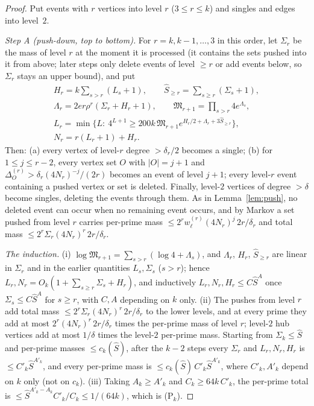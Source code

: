 \documentclass[11pt,reqno]{amsart}
\theoremstyle{definition}
\begin{document}
\begin{proof}
Put events with $r$ vertices into level $r$ ($3\le r\le k$) and singles and
edges into level~$2$.

\emph{Step A (push-down, top to bottom).}  For $r=k,k-1,\dots,3$ in this order,
let $\Sigma_r$ be the mass of level $r$ at the moment it is processed (it
contains the sets pushed into it from above; later steps only delete events
of level $\ge r$ or add events below, so $\Sigma_r$ stays an upper bound), and
put
\begin{gather*}
 H_r=k\sum_{s>r}(L_s+1),\qquad \hat S_{\ge r}=\sum_{s\ge r}(\Sigma_s+1),\\
 \Lambda_r=2er\rho^r(\Sigma_r+H_r+1),\qquad \mathfrak M_{r+1}=\prod_{s>r}4e^{\Lambda_s},\\
 L_r=\min\{L:\ 4^{L+1}\ge200k\,\mathfrak M_{r+1}e^{H_r/2+\Lambda_r+3\hat S_{\ge r}}\},\\
 N_r=r(L_r+1)+H_r .
\end{gather*}
Then: \textup{(a)} every vertex of level-$r$ degree $>\delta_r/2$ becomes a
single; \textup{(b)} for $1\le j\le r-2$, every vertex set $O$ with $|O|=j+1$
and $\Delta^{(r)}_O>\delta_r(4N_r)^{-j}/(2r)$ becomes an event of level $j+1$;
every level-$r$ event containing a pushed vertex or set is deleted.  Finally,
level-$2$ vertices of degree $>\delta$ become singles, deleting the events
through them.  As in Lemma~\ref{lem:push}, no deleted event can occur when no
remaining event occurs, and by Markov a set pushed from level $r$ carries
per-prime mass $\le2^rw^{(r)}_\ell(4N_r)^j\,2r/\delta_r$ and total mass
$\le2^r\Sigma_r(4N_r)^r\,2r/\delta_r$.

\emph{The induction.}  (i) $\log\mathfrak M_{r+1}=\sum_{s>r}(\log4+\Lambda_s)$, and
$\Lambda_r$, $H_r$, $\hat S_{\ge r}$ are linear in $\Sigma_r$ and in the earlier
quantities $L_s,\Sigma_s$ ($s>r$); hence
$L_r,N_r=O_k(1+\sum_{s\ge r}\Sigma_s+H_r)$, and inductively
$L_r,N_r,H_r\le C\hat S^{A}$ once $\Sigma_s\le C\hat S^{A}$ for $s\ge r$, with
$C,A$ depending on $k$ only.  (ii) The pushes from level $r$ add total mass
$\le2^r\Sigma_r(4N_r)^r\,2r/\delta_r$ to the lower levels, and at every prime
they add at most $2^r(4N_r)^r\,2r/\delta_r$ times the per-prime mass of level
$r$; level-$2$ hub vertices add at most $1/\delta$ times the level-$2$ per-prime
mass.  Starting from $\Sigma_k\le\hat S$ and per-prime masses $\le c_k(\hat S)$,
after the $k-2$ steps every $\Sigma_r$ and $L_r,N_r,H_r$ is $\le C'_k\hat S^{A'_k}$,
and every per-prime mass is $\le c_k(\hat S)\,C'_k\hat S^{A'_k}$, where
$C'_k,A'_k$ depend on $k$ only (not on $c_k$).  (iii) Taking $A_k\ge A'_k$ and
$C_k\ge64k\,C'_k$, the per-prime total is
$\le\hat S^{A'_k-A_k}C'_k/C_k\le1/(64k)$, which is (P$_k$).


\end{proof}
\end{document}
